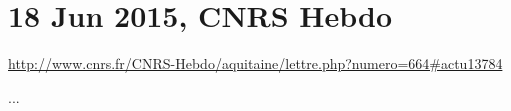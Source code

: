 \documentclass{deliverablereport}
\author{Nicolas M. Thiéry}
\begin{document}
\maketitle
\githubissuedescription
\tableofcontents

\clearpage
\appendix
\section{18 Jun 2015, CNRS Hebdo}

{\scriptsize \url{http://www.cnrs.fr/CNRS-Hebdo/aquitaine/lettre.php?numero=664#actu13784}}

\bigskip


\bigskip
\centerline{...}
\bigskip
\end{document}
